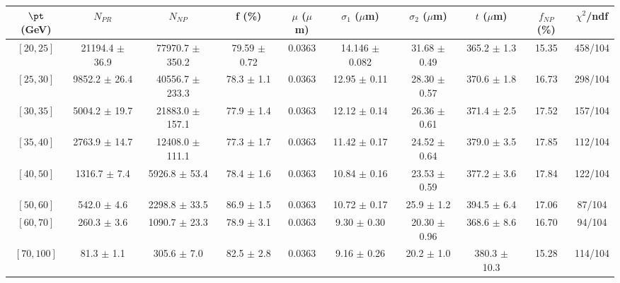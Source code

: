 \begin{tabular}{c||c|c|c|c|c|c|c||c|c}
$\pt$ (GeV) & $N_{PR}$ & $N_{NP}$ & f (\%) & $\mu$ ($\mu$m) & $\sigma_1$ ($\mu$m) & $\sigma_2$ ($\mu$m)  & $t$ ($\mu$m) & $f_{NP}$ (\%) & $\chi^2$/ndf \\
\hline
$[20, 25]$ & 21194.4 $\pm$ 36.9 & 77970.7 $\pm$ 350.2 & 79.59 $\pm$ 0.72 & 0.0363 & 14.146 $\pm$ 0.082 & 31.68 $\pm$ 0.49 & 365.2 $\pm$ 1.3 & 15.35 & 458/104\\
$[25, 30]$ & 9852.2 $\pm$ 26.4 & 40556.7 $\pm$ 233.3 & 78.3 $\pm$ 1.1 & 0.0363 & 12.95 $\pm$ 0.11 & 28.30 $\pm$ 0.57 & 370.6 $\pm$ 1.8 & 16.73 & 298/104\\
$[30, 35]$ & 5004.2 $\pm$ 19.7 & 21883.0 $\pm$ 157.1 & 77.9 $\pm$ 1.4 & 0.0363 & 12.12 $\pm$ 0.14 & 26.36 $\pm$ 0.61 & 371.4 $\pm$ 2.5 & 17.52 & 157/104\\
$[35, 40]$ & 2763.9 $\pm$ 14.7 & 12408.0 $\pm$ 111.1 & 77.3 $\pm$ 1.7 & 0.0363 & 11.42 $\pm$ 0.17 & 24.52 $\pm$ 0.64 & 379.0 $\pm$ 3.5 & 17.85 & 112/104\\
$[40, 50]$ & 1316.7 $\pm$ 7.4 & 5926.8 $\pm$ 53.4 & 78.4 $\pm$ 1.6 & 0.0363 & 10.84 $\pm$ 0.16 & 23.53 $\pm$ 0.59 & 377.2 $\pm$ 3.6 & 17.84 & 122/104\\
$[50, 60]$ & 542.0 $\pm$ 4.6 & 2298.8 $\pm$ 33.5 & 86.9 $\pm$ 1.5 & 0.0363 & 10.72 $\pm$ 0.17 & 25.9 $\pm$ 1.2 & 394.5 $\pm$ 6.4 & 17.06 & 87/104\\
$[60, 70]$ & 260.3 $\pm$ 3.6 & 1090.7 $\pm$ 23.3 & 78.9 $\pm$ 3.1 & 0.0363 & 9.30 $\pm$ 0.30 & 20.30 $\pm$ 0.96 & 368.6 $\pm$ 8.6 & 16.70 & 94/104\\
$[70, 100]$ & 81.3 $\pm$ 1.1 & 305.6 $\pm$ 7.0 & 82.5 $\pm$ 2.8 & 0.0363 & 9.16 $\pm$ 0.26 & 20.2 $\pm$ 1.0 & 380.3 $\pm$ 10.3 & 15.28 & 114/104\\
\end{tabular}
